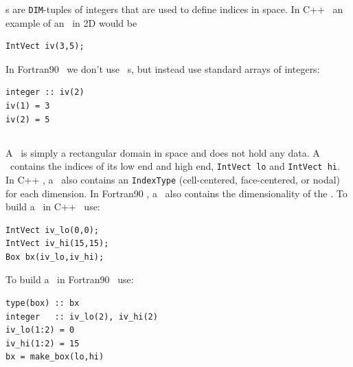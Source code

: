 \IntVect s are {\tt DIM}-tuples of integers that are used to define
indices in space.  In C++ \BoxLib\, an example of an \IntVect\ in 2D would be

\begin{lstlisting}[language={[gnu]make},mathescape=false]
IntVect iv(3,5);
\end{lstlisting}
In Fortran90 \BoxLib\, we don't use \IntVect\ s, but instead use standard
arrays of integers:
\begin{lstlisting}[language={[gnu]make},mathescape=false]
integer :: iv(2)
iv(1) = 3
iv(2) = 5
\end{lstlisting}

\subsection{\BoxType}

A \BoxType\ is simply a rectangular domain in space and does not hold any data.
A \BoxType\ contains the indices of its low end and high end, 
{\tt IntVect lo} and {\tt IntVect hi}.  In C++ \BoxLib, a \BoxType\ also
contains an {\tt IndexType} (cell-centered, face-centered, or nodal) for each
dimension.  In Fortran90 \BoxLib, a \BoxType\ also contains the dimensionality 
of the \BoxType.  To build a \BoxType\ in C++ \BoxLib\ use:
\begin{lstlisting}[language={[gnu]make},mathescape=false]
IntVect iv_lo(0,0);
IntVect iv_hi(15,15);
Box bx(iv_lo,iv_hi);
\end{lstlisting}
To build a \BoxType\ in Fortran90 \BoxLib\ use:
\begin{lstlisting}[language={[gnu]make},mathescape=false]
type(box) :: bx
integer   :: iv_lo(2), iv_hi(2)
iv_lo(1:2) = 0
iv_hi(1:2) = 15
bx = make_box(lo,hi)
\end{lstlisting}

